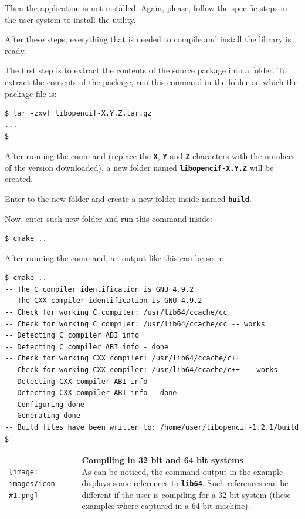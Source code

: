 \documentclass[11pt,twoside,openany,x11names,svgnames]{memoir}
\makeatletter
\newcommand{\IconNote}[3]
{
	\begin{table}[ht]
	\begin{tabular}{ lm{\dimexpr\textwidth-8\tabcolsep-\wd0}@{}}
		\toprule
		\texttt{[image: images/icon-\#1.png]}
		&
		\parbox[t]{155mm}{
		\textbf{#2} \\
		#3
		}
	\end{tabular}
\end{table}
}
\makeatother
\begin{document}
Then the application is not installed. Again, please, follow the specific steps in the user system to install the utility.

After these steps, everything that is needed to compile and install the library is ready.

The first step is to extract the contents of the source package into a folder. To extract the contents of the package, run this command in the folder on which the package file is:

\begin{lstlisting}[frame=single,style=SystemCommandStyle]
$ tar -zxvf libopencif-X.Y.Z.tar.gz
...
$
\end{lstlisting}

After running the command (replace the \textbf{\texttt{X}}, \textbf{\texttt{Y}} and \textbf{\texttt{Z}} characters with the numbers of the version downloaded), a new folder named \textbf{\texttt{libopencif-X.Y.Z}} will be created.

Enter to the new folder and create a new folder inside named \textbf{\texttt{build}}.

Now, enter such new folder and run this command inside:

\begin{lstlisting}[frame=single,style=SystemCommandStyle]
$ cmake ..
\end{lstlisting}

After running the command, an output like this can be seen:

\begin{lstlisting}[frame=single,style=SystemCommandStyle]
$ cmake ..
-- The C compiler identification is GNU 4.9.2
-- The CXX compiler identification is GNU 4.9.2
-- Check for working C compiler: /usr/lib64/ccache/cc
-- Check for working C compiler: /usr/lib64/ccache/cc -- works
-- Detecting C compiler ABI info
-- Detecting C compiler ABI info - done
-- Check for working CXX compiler: /usr/lib64/ccache/c++
-- Check for working CXX compiler: /usr/lib64/ccache/c++ -- works
-- Detecting CXX compiler ABI info
-- Detecting CXX compiler ABI info - done
-- Configuring done
-- Generating done
-- Build files have been written to: /home/user/libopencif-1.2.1/build
$
\end{lstlisting}

\IconNote
	{info}
	{Compiling in 32 bit and 64 bit systems}
	{As can be noticed, the command output in the example displays some references to \textbf{\texttt{lib64}}. Such references can be different if the user is compiling for a 32 bit system (these examples where captured in a 64 bit machine).}
\end{document}
